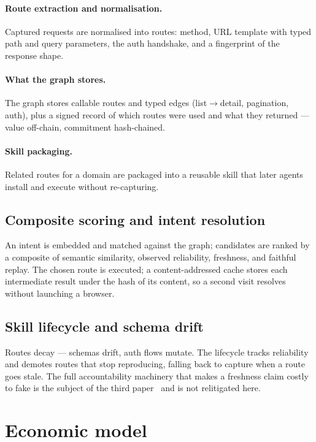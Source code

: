 \documentclass[11pt]{article}
\begin{document}
\paragraph{Route extraction and normalisation.} Captured requests are normalised
into routes: method, URL template with typed path and query parameters, the auth
handshake, and a fingerprint of the response shape.
\paragraph{What the graph stores.} The graph stores callable routes and typed edges
(list$\to$detail, pagination, auth), plus a signed record of which routes were used
and what they returned --- value off-chain, commitment hash-chained.
\paragraph{Skill packaging.} Related routes for a domain are packaged into a
reusable skill that later agents install and execute without re-capturing.

\subsection{Composite scoring and intent resolution}
An intent is embedded and matched against the graph; candidates are ranked by a
composite of semantic similarity, observed reliability, freshness, and faithful
replay. The chosen route is executed; a content-addressed cache stores each
intermediate result under the hash of its content, so a second visit resolves
without launching a browser.

\subsection{Skill lifecycle and schema drift}
Routes decay --- schemas drift, auth flows mutate. The lifecycle tracks reliability
and demotes routes that stop reproducing, falling back to capture when a route goes
stale. The full accountability machinery that makes a freshness claim costly to
fake is the subject of the third paper~\cite{maintenance} and is not relitigated
here.

\section{Economic model}
\end{document}
